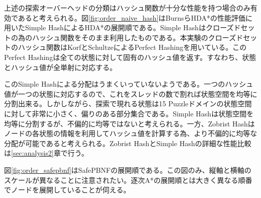\documentclass[uplatex]{jsarticle}
\begin{document}
上述の探索オーバーヘッドの分類はハッシュ関数が十分な性能を持つ場合のみ有効であると考えられる。図\ref{fig:order_naive_hash}はBurnsらHDA*の性能評価に用いたSimple HashによるHDA*の展開順である。Simple Hashはクローズドセットの為のハッシュ関数をそのまま利用したものである。本実験のクローズドセットのハッシュ関数はKorfとSchultzeによるPerfect Hashingを用いている\cite{korf2005large}。このPerfect Hashingは全ての状態に対して固有のハッシュ値を返す。すなわち、状態とハッシュ値が全単射に対応する。

このSimple Hashによる分配はうまくいっていないようである。一つのハッシュ値が一つの状態に対応するので、これをスレッドの数で割れば状態空間を均等に分割出来る。しかしながら、探索で現れる状態は15 Puzzleドメインの状態空間に対して非常に小さく、偏りのある部分集合である。Simple Hashは状態空間を均等に分割するが、不偏的に均等ではないと考えられる。一方、Zobrist Hashはノードの各状態の情報を利用してハッシュ値を計算する為、より不偏的に均等な分配が可能であると考えられる。Zobrist HashとSimple Hashの詳細な性能比較は\ref{sec:analysis2}章で行う。

\begin{comment}
状態$s$は整数列$\mathbf{x} = (x_{0}, x_{1}, …, x_{n})$で表せられるとする。Simple Hashは状態$s$をに対して以下の式で与えられる。
\newline
\begin{equation}
	H(s) = \sum\nolimits_{i = 0}^{n}x_{i} l_{i}
\end{equation}

Simple Hash分配はうまくいっていないようである。
15 Puzzleドメインの場合、$x_{i}$は各タイルの位置を表し、$l_{i}$は全て16である。スレッドの数が2, 4, 8, 16の場合、Simple Hashは15 Puzzleドメインの状態空間を均等に分割する。しかしながら、この時ハッシュ値は$x_{0}$の値のみに依存する。状態の一部分の情報しか利用していない為、状態空間に対して\textbf{不偏的に}均等な分割をすることが出来ない。探索で現れる状態は15 Puzzleドメインの状態空間に対して非常に小さく、偏りのある部分集合である。よって、Simple HashはA*探索で現れるノードを均等に分配することは出来ないと考えられる。Zobrist HashとSimple Hashの詳細な性能比較は\ref{sec:analysis2}章で行う。
\newline
\end{comment}


図\ref{fig:order_safepbnf}はSafePBNFの展開順である。この図のみ、縦軸と横軸のスケールが異なることに注意されたい。逐次A*の展開順とは大きく異なる順番でノードを展開していることが伺える。
\newline
\end{document}

